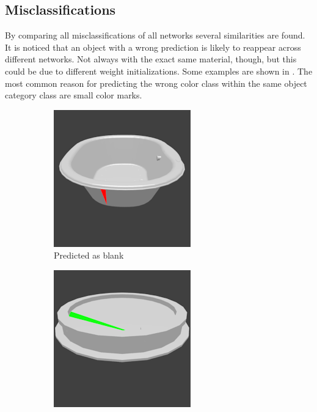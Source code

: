 \subsection{Misclassifications}
\label{sec:predictions-misclassifications}
By comparing all misclassifications of all networks several similarities are found.
It is noticed that an object with a wrong prediction is likely to reappear across different networks.
Not always with the exact same material, though, but this could be due to different weight initializations.
Some examples are shown in .
The most common reason for predicting the wrong color class within the same object category class are small color marks.
\begin{figure}
	\centering
	\begin{subfigure}{.3\textwidth}
		\centering
		\includegraphics[width=.8\textwidth]{images/bathtub_0117_2_006.png}
		\caption{Predicted as blank}
		\label{fig:small-features-a}
	\end{subfigure}
	\begin{subfigure}{.3\textwidth}
		\centering
		\includegraphics[width=.8\textwidth]{images/bathtub_0127_1_007.png}

\end{subfigure}
\end{figure}
